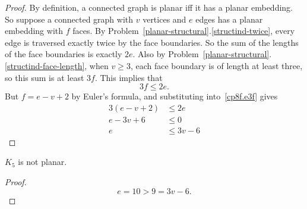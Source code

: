 \documentclass[handout]{mcs}
\begin{document}
\begin{proof}
By definition, a connected graph is planar iff it has a planar embedding.
So suppose a connected graph with $v$ vertices and $e$ edges has a planar
embedding with $f$ faces.  By
Problem~\ref{planar-structural}.\ref{structind-twice}, every edge is traversed
exactly twice by the face boundaries.  So the sum of the lengths of the
face boundaries is exactly $2e$.  Also by
Problem~\ref{planar-structural}.\ref{structind-face-length}, when $v \geq 3$, each
face boundary is of length at least three, so this sum is at least $3f$.
This implies that
\begin{equation}\label{cp8f.e3f}
3f \leq 2e.
\end{equation}
But $f = e-v+2$ by Euler's formula, and substituting into~\eqref{cp8f.e3f} gives
\begin{align*}
3(e-v+2) & \leq 2e\\
e-3v + 6  & \leq 0\\
e & \leq 3v - 6
\end{align*}
\end{proof}

\begin{corollary}
$K_5$ is not planar.
\end{corollary}

\begin{proof}
\[
e = 10 > 9 = 3v-6.
\]
\end{proof}
\iffalse
\end{document}
